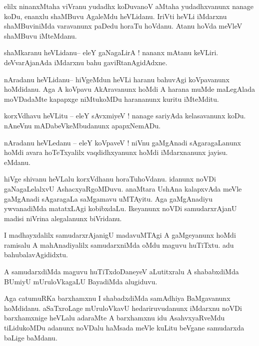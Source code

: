 \documentclass{article}
\begin{document}
\begin{mn}%
elilx ninanxMtaha viVranu yudadhx koDuvanoV aMtaha yudadhxvanunx nanage koDu, enanxlu shaMBuvu
AgaleMdu heVLidanu. IriVti heVLi iMdarxnu shaMBuviniMda varavanunx paDedu horaTu hoVdanu. 
Atanu hoVda meVleV shaMBuvu iMteMdanu.
\end{mn}

\begin{mn}%
shaMkaranu heVLidanu-- eleY gaNagaLirA ! nananx mAtanu keVLiri. deVvarAjanAda iMdarxnu bahu 
gaviRtanAgidAdxne.
\end{mn}

\begin{mn}%
nAradanu heVLidanu-- hiVgeMdun heVLi haranu bahuvAgi koVpavanunx hoMdidanu. Aga A koVpavu 
AkAravanunx hoMdi A harana muMde maLegAlada moVDadaMte kapapxge niMtukoMDu harananunx 
kuritu iMteMditu.
\end{mn}

\begin{mn}%
korxVdhavu heVLitu -- eleY sAvxmiyeV ! nanage sariyAda kelasavanunx koDu. nAneVnu 
mADabeVkeMbudanunx apapxNemADu.
\end{mn}

\begin{mn}%
nAradanu heVLedanu -- eleY koVpaveV ! niVnu gaMgAnadi sAgaragaLanunx hoMdi avara 
hoTeTxyalilx vaqdidhxyanunx hoMdi iMdarxnanunx jayisu. eMdanu.
\end{mn}

\begin{mn}%
hiVge shivanu heVLalu korxVdhanu horaTuhoVdanu. idanunx noVDi gaNagaLelalxvU 
AshacxyaRgoMDuvu. anaMtara UshAna kalapxvAda meVle gaMgAnadi sAgaragaLa saMgamavu uMTAyitu. 
Aga gaMgAnadiyu ywvanadiMda matatxLAgi kobibxdaLu. Ikeyanunx noVDi samudarxrAjanU madisi 
niVrina alegalanunx biVridanu.
\end{mn}

\begin{mn}%
I madhayxdalilx samudarxrAjanigU madavuMTAgi A gaMgeyanunx hoMdi ramisalu A mahAnadiyalilx 
samudarxniMda oMdu maguvu huTiTxtu. adu bahubalavAgididxtu.
\end{mn}

\begin{mn}%
A samudarxdiMda maguvu huTiTxdoDaneyeV aLutitxralu A shababxdiMda BUmiyU mUruloVkagaLU 
BayadiMda alugiduvu.
\end{mn}

\begin{mn}%
Aga catumuRKa barxhamxnu I shabadxdiMda samAdhiya BaMgavanunx hoMdidanu. aSaTxroLage 
mUruloVkavU hedariruvudanunx iMdarxnu noVDi barxhamxnige heVLalu  adaraMte A barxhamxnu idu 
AsahvxyaRveMdu tiLidukoMDu adanunx noVDalu haMsada meVle kuLitu beVgane samudarxda baLige 
baMdanu. 
\end{mn}
\end{document}
